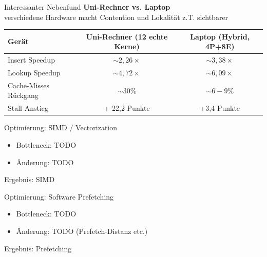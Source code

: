 \documentclass[aspectratio=169,13pt]{beamer}
\begin{document}
	\begin{frame}{Interessanter Nebenfund}
		\textbf{Uni-Rechner vs. Laptop}\\
		verschiedene Hardware macht Contention und Lokalität z.T. sichtbarer\\
		\vspace{0,4cm}
		\begin{tabular}{lcc}
			\toprule
			Gerät & Uni-Rechner (12 echte Kerne) & Laptop (Hybrid, 4P+8E) \\
			\midrule
			Insert Speedup & $\sim2,26\times$ & $\sim3,38\times$\\
			Lookup Speedup & $\sim4,72\times$ & $\sim6,09\times$\\
			Cache-Misses Rückgang & $\sim30\%$ & $\sim6-9\%$ \\
			Stall-Anstieg & + 22,2 Punkte & +3,4 Punkte \\
			\bottomrule
		\end{tabular}
	\end{frame}
	
	
	\begin{frame}{Optimierung: SIMD / Vectorization}
		\begin{itemize}
			\item Bottleneck: TODO
			\item Änderung: TODO
		\end{itemize}
	\end{frame}
	
	\begin{frame}{Ergebnis: SIMD}
		\centering
	\end{frame}
	
	\begin{frame}{Optimierung: Software Prefetching}
		\begin{itemize}
			\item Bottleneck: TODO
			\item Änderung: TODO (Prefetch-Distanz etc.)
		\end{itemize}
	\end{frame}
	
	\begin{frame}{Ergebnis: Prefetching}
		\centering
	\end{frame}
	
\end{document}
